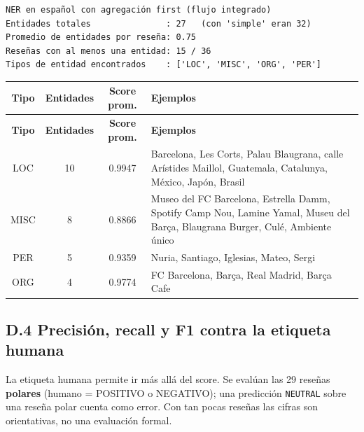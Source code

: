 \documentclass[12pt,a4paper]{article}
\begin{document}
\begin{lstlisting}[style=salida]
NER en español con agregación first (flujo integrado)
Entidades totales               : 27   (con 'simple' eran 32)
Promedio de entidades por reseña: 0.75
Reseñas con al menos una entidad: 15 / 36
Tipos de entidad encontrados    : ['LOC', 'MISC', 'ORG', 'PER']
\end{lstlisting}

{\footnotesize\renewcommand{\arraystretch}{1.3}
\begin{longtable}{|c|c|c|>{\raggedright\arraybackslash}p{9.2cm}|}
\hline
\textbf{Tipo} & \textbf{Entidades} & \textbf{Score prom.} & \textbf{Ejemplos} \\ \hline
\endfirsthead
\hline
\textbf{Tipo} & \textbf{Entidades} & \textbf{Score prom.} & \textbf{Ejemplos} \\ \hline
\endhead
LOC & 10 & 0.9947 & Barcelona, Les Corts, Palau Blaugrana, calle Arístides Maillol, Guatemala, Catalunya, México, Japón, Brasil \\ \hline
MISC & 8 & 0.8866 & Museo del FC Barcelona, Estrella Damm, Spotify Camp Nou, Lamine Yamal, Museu del Barça, Blaugrana Burger, Culé, Ambiente único \\ \hline
PER & 5 & 0.9359 & Nuria, Santiago, Iglesias, Mateo, Sergi \\ \hline
ORG & 4 & 0.9774 & FC Barcelona, Barça, Real Madrid, Barça Cafe \\ \hline
\end{longtable}}


\subsection{D.4 Precisión, recall y F1 contra la etiqueta humana}

La etiqueta humana permite ir más allá del score. Se evalúan las 29 reseñas \textbf{polares}
(humano = POSITIVO o NEGATIVO); una predicción \texttt{NEUTRAL} sobre una reseña polar cuenta como
error. Con tan pocas reseñas las cifras son orientativas, no una evaluación formal.
\end{document}

